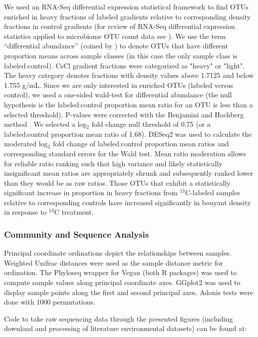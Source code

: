 We used an RNA-Seq differential expression statistical framework
\citep{Love_2014} to find OTUs enriched in heavy fractions of labeled
gradients relative to corresponding density fractions in control gradients
(for review of RNA-Seq differential expression statistics applied to
microbiome OTU count data see \citet{McMurdie_2014}). We use the term
“differential abundance” (coined by \citet{McMurdie_2014}) to denote OTUs that
have different proportion means across sample classes (in this case the only
sample class is labeled:control).  CsCl gradient fractions were categorized
as "heavy" or "light". The heavy category denotes fractions with density
values above 1.7125 and below 1.755 g/mL. Since we are only interested in enriched OTUs
(labeled versus control), we used a one-sided wald-test for differential
abundance (the null hypothesis is the labeled:control proportion mean ratio
for an OTU is less than a selected threshold). P-values were corrected with
the Benjamini and Hochberg method  \citep{Benjamini_1997}. We selected a
log$_{2}$ fold change null threshold of 0.75 (or a labeled:control proportion
mean ratio of 1.68). DESeq2 was used to calculate the moderated log$_{2}$
fold change of labeled:control proportion mean ratios and corresponding
standard errors for the Wald test. Mean ratio moderation allows for reliable ratio ranking such
that high variance and likely statistically insignificant mean ratios are
appropriately shrunk and subsequently ranked lower than they would be as raw
ratios. Those OTUs that exhibit a statistically significant increase in
proportion in heavy fractions from $^{13}$C-labeled samples relative to
corresponding controls have increased significantly in bouyant density in
response to $^{13}$C treatment.

\subsubsection{Community and Sequence Analysis}
Principal coordinate ordinations depict the relationships between
samples. Weighted Unifrac \citep{Lozupone_2005} distances were
used as the sample distance metric for ordination. The Phyloseq
\citep{McMurdie_2013} wrapper for Vegan \cite{Dixon_2003} (both R packages) was
used to compute sample values along principal coordinate axes. GGplot2
\cite{Wickham_2009} was used to display sample points along the first and
second principal axes. Adonis tests \cite{Anderson_2001} were done with 1000
permutations.

Code to take raw sequencing data through the presented figures (including
download and processing of literature environmental datasets) can be
found at:


